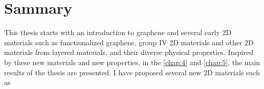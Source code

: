 
\chapter{Sammary}

This thesis starts with an introduction to graphene and several early 2D materials such as functionalized graphene, group IV 2D materials and other 2D materials from layered materials. and their diverse physical properties. Inspired by these new materials and new properties, in the \autoref{chap:4} and \autoref{chap:5}, the main results of the thesis are presented. I have proposed several new 2D materials such as 